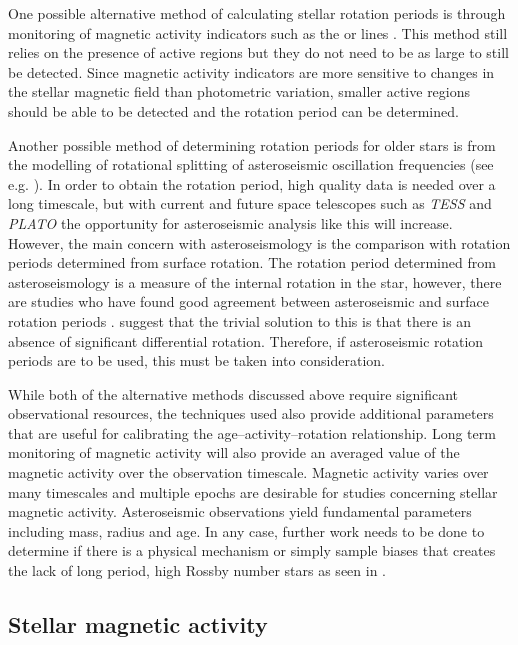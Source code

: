 One possible alternative method of calculating stellar rotation periods is through monitoring of magnetic activity indicators such as the \caII or \Halpha lines \citep{Boro_Saikia_etal_2016,Robertson_etal_2015_GJ176}. This method still relies on the presence of active regions but they do not need to be as large to still be detected. Since magnetic activity indicators are more sensitive to changes in the stellar magnetic field than photometric variation, smaller active regions should be able to be detected and the rotation period can be determined. 

Another possible method of determining rotation periods for older stars is from the modelling of rotational splitting of asteroseismic oscillation frequencies (see e.g. \citet{Davies_etal_2015}). In order to obtain the rotation period, high quality data is needed over a long timescale, but with current and future space telescopes such as \textit{TESS} and \textit{PLATO} the opportunity for asteroseismic analysis like this will increase. However, the main concern with asteroseismology is the comparison with rotation periods determined from surface rotation. The rotation period determined from asteroseismology is a measure of the internal rotation in the star, however, there are studies who have found good agreement between asteroseismic and surface rotation periods \citet{Chaplin_etal_2013,Gizon_etal_2013}. \citet{Davies_etal_2015} suggest that the trivial solution to this is that there is an absence of significant differential rotation. Therefore, if asteroseismic rotation periods are to be used, this must be taken into consideration.

While both of the alternative methods discussed above require significant observational resources, the techniques used also provide additional parameters that are useful for calibrating the age--activity--rotation relationship. Long term monitoring of magnetic activity will also provide an averaged value of the magnetic activity over the observation timescale. Magnetic activity varies over many timescales and multiple epochs are desirable for studies concerning stellar magnetic activity. Asteroseismic observations yield fundamental parameters including mass, radius and age. In any case, further work needs to be done to determine if there is a physical mechanism or simply sample biases that creates the lack of long period, high Rossby number stars as seen in \citet{van_Saders_etal_2019}.

\subsection{Stellar magnetic activity}

